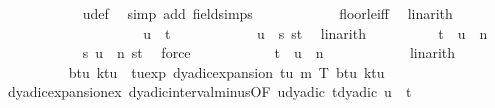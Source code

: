 \begin{isabellebody}
\ \ \ \ \ \ \ \ \ \ \isamarkupfalse%
\ u{\isacharunderscore}{\kern0pt}def\ \isamarkupfalse%
\ {\isacharparenleft}{\kern0pt}simp\ add{\isacharcolon}{\kern0pt}\ field{\isacharunderscore}{\kern0pt}simps{\isacharparenright}{\kern0pt}\isanewline
\ \ \ \ \ \ \ \ \ \ \isamarkupfalse%
\ floor{\isacharunderscore}{\kern0pt}le{\isacharunderscore}{\kern0pt}iff\ \isamarkupfalse%
\ linarith\isanewline
\ \ \ \ \ \ \ \ \ \ \isamarkupfalse%
\isanewline
\ \ \ \ \ \ \ \ \isamarkupfalse%
\ {\isachardoublequoteopen}u\ {\isasymle}\ t{\isachardoublequoteclose}\isanewline
\ \ \ \ \ \ \ \ \ \ \isamarkupfalse%
\ {\isacartoucheopen}u\ {\isasymle}\ s{\isacartoucheclose}\ st{\isacharparenleft}{\kern0pt}{}{\isacharparenright}{\kern0pt}\ \isamarkupfalse%
\ linarith\isanewline
\ \ \ \ \ \ \ \ \isamarkupfalse%
\ {\isachardoublequoteopen}t\ {\isacharless}{\kern0pt}\ u\ {\isacharplus}{\kern0pt}\ {}{\isacharslash}{\kern0pt}{}{\isacharcircum}{\kern0pt}n{\isachardoublequoteclose}\isanewline
\ \ \ \ \ \ \ \ \ \ \isamarkupfalse%
\ {\isacartoucheopen}s\ {\isacharless}{\kern0pt}u\ {\isacharplus}{\kern0pt}\ {}{\isacharslash}{\kern0pt}{}{\isacharcircum}{\kern0pt}n{\isacartoucheclose}\ st{\isacharparenleft}{\kern0pt}{}{\isacharparenright}{\kern0pt}\ \isamarkupfalse%
\ force\isanewline
\ \ \ \ \ \ \ \ \isamarkupfalse%
\ \isamarkupfalse%
\ {\isachardoublequoteopen}t\ {\isacharminus}{\kern0pt}\ u\ {\isacharless}{\kern0pt}\ {}{\isacharslash}{\kern0pt}{}{\isacharcircum}{\kern0pt}n{\isachardoublequoteclose}\isanewline
\ \ \ \ \ \ \ \ \ \ \isamarkupfalse%
\ linarith\isanewline
\ \ \ \ \ \ \ \ \isamarkupfalse%
\ b{\isacharunderscore}{\kern0pt}tu\ k{\isacharunderscore}{\kern0pt}tu\ \ tu{\isacharunderscore}{\kern0pt}exp{\isacharcolon}{\kern0pt}\ {\isachardoublequoteopen}dyadic{\isacharunderscore}{\kern0pt}expansion\ {\isacharparenleft}{\kern0pt}t{\isacharminus}{\kern0pt}u{\isacharparenright}{\kern0pt}\ m\ T\ b{\isacharunderscore}{\kern0pt}tu\ k{\isacharunderscore}{\kern0pt}tu{\isachardoublequoteclose}\isanewline
\ \ \ \ \ \ \ \ \ \ \isamarkupfalse%
\ dyadic{\isacharunderscore}{\kern0pt}expansion{\isacharunderscore}{\kern0pt}ex\ dyadic{\isacharunderscore}{\kern0pt}interval{\isacharunderscore}{\kern0pt}minus{\isacharbrackleft}{\kern0pt}OF\ u{\isacharunderscore}{\kern0pt}dyadic\ t{\isacharunderscore}{\kern0pt}dyadic\ {\isacartoucheopen}u\ {\isasymle}\ t{\isacartoucheclose}{\isacharbrackright}{\kern0pt}\ \isamarkupfalse%

\end{isabellebody}
